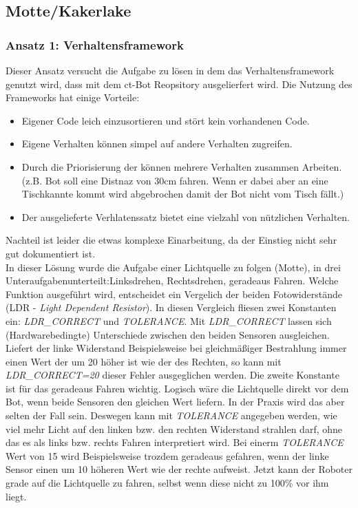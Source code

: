 \subsection{Motte/Kakerlake}
\label{motte_kakerlake}

\subsubsection{Ansatz 1: Verhaltensframework}
Dieser Ansatz versucht die Aufgabe zu lösen in dem das Verhaltensframework
genutzt wird, dass mit dem ct-Bot Reopsitory ausgelierfert wird. Die Nutzung des 
Frameworks hat einige Vorteile:
\begin{itemize}
	\item Eigener Code leich einzusortieren und stört kein vorhandenen Code.
	\item Eigene Verhalten können simpel auf andere Verhalten zugreifen.
	\item Durch die Priorisierung der können mehrere Verhalten zusammen Arbeiten.
		(z.B. Bot soll eine Distnaz von 30cm fahren. Wenn er dabei aber an eine
		Tischkannte kommt wird abgebrochen damit der Bot nicht vom Tisch fällt.)
	\item Der ausgelieferte Verhlatenssatz bietet eine vielzahl von nützlichen
		Verhalten.
\end{itemize}
Nachteil ist leider die etwas komplexe Einarbeitung, da der Einstieg nicht sehr gut
dokumentiert ist. \\

In dieser Lösung wurde die Aufgabe einer Lichtquelle zu folgen (Motte), in drei
Unteraufgabenunterteilt:Linksdrehen, Rechtsdrehen, geradeaus Fahren.
Welche Funktion ausgeführt wird, entscheidet ein Vergelich der beiden Fotowiderstände
(LDR - \textit{Light Dependent Resistor}). In diesen Vergleich fliesen zwei Konstanten ein:
\textit{LDR\_CORRECT} und \textit{TOLERANCE}. Mit \textit{LDR\_CORRECT} lassen sich
(Hardwarebedingte) Unterschiede zwischen den beiden Sensoren ausgleichen. Liefert
der linke Widerstand Beispielsweise bei gleichmäßiger Bestrahlung immer einen
Wert der um 20 höher ist wie der des Rechten, so kann mit \textit{LDR\_CORRECT=20} dieser
Fehler ausgeglichen werden. Die zweite Konstante ist für das geradeaus Fahren wichtig.
Logisch wäre die Lichtquelle direkt vor dem Bot, wenn beide Sensoren den gleichen
Wert liefern. In der Praxis wird das aber selten der Fall sein. Deswegen kann mit
\textit{TOLERANCE} angegeben werden, wie viel mehr Licht auf den linken bzw. den rechten
Widerstand strahlen darf, ohne das es als links bzw. rechts Fahren interpretiert wird.
Bei einerm \textit{TOLERANCE} Wert von 15 wird Beispielsweise trozdem geradeaus gefahren,
wenn der linke Sensor einen um 10 höheren Wert wie der rechte aufweist. Jetzt kann
der Roboter grade auf die Lichtquelle zu fahren, selbst wenn diese nicht zu 100\%
vor ihm liegt. \\

